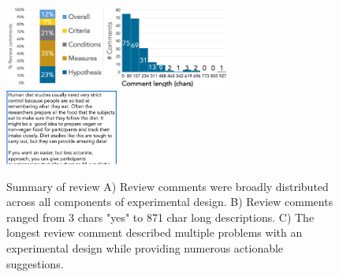 \begin{figure}[h] 
  \includegraphics[width=0.66\textwidth]{figures/galileo/galileo-study2-2}
  \includegraphics[width=0.33\textwidth]{figures/galileo/galileo-study2-3}
  \caption[Result: Review comments were distributed across all components of experimental design]
{Summary of review A) Review comments were broadly distributed across all components of experimental design. B) Review comments ranged from 3 chars "yes" to 871 char long descriptions. C) The longest review comment described multiple problems with an experimental design while providing numerous actionable suggestions. }
  \label{fig:galileo-result2-2}
\end{figure}

